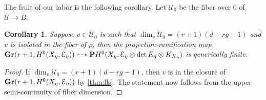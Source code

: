\documentclass[11pt,reqno]{amsart}
\theoremstyle{plain}
\newtheorem{corollary}[theorem]{Corollary}
\theoremstyle{definition}
\theoremstyle{remark}
\numberwithin{equation}{section}
\renewcommand{\to}{{\longrightarrow}}
\numberwithin{equation}{section}
\begin{document}
The fruit of our labor is the following corollary.
Let $\mathcal U_0$ be the fiber over $0$ of $\mathcal U \to B$.
\begin{corollary}\label{prop:degeneration}
  Suppose $v \in \mathcal U_0$ is such that $\dim_v \mathcal U_0 = (r+1)(d-rg-1)$ and $v$ is isolated in the fiber of $\rho$, then the projection-ramification map ${\bf Gr}(r+1, H^0(X_\eta, \mathcal E_\eta)) \dashrightarrow {\bf P} H^0(X_\eta, \mathcal E_\eta \otimes \det E_\eta \otimes K_{X_\eta})$ is generically finite.
\end{corollary}
\begin{proof}
  If $\dim_v \mathcal U_0 = (r+1)(d-rg-1)$, then $v$ is in the closure of ${\bf Gr}(r+1, H^0(X_\eta, \mathcal E_\eta))$ by \autoref{thm:lls}.
  The statement now follows from the upper semi-continuity of fiber dimension.
\end{proof}
\end{document}
